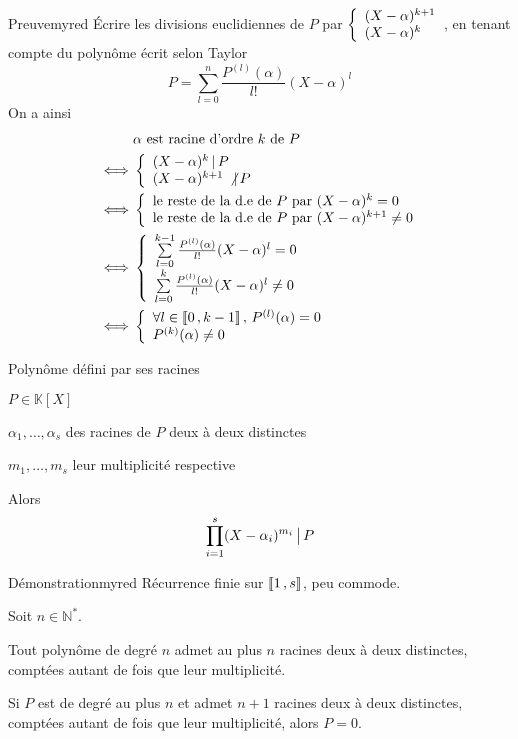     \begin{demo}{Preuve}{myred}
        Écrire les divisions euclidiennes de $P$ par $\et{(X-\alpha)^{k+1}}{(X-\alpha)^k}$, en tenant compte du polynôme écrit selon Taylor 
            \[ P = \sum\limits_{l=0}^n \frac{P^{(l)}(\alpha)}{l!} (X-\alpha)^l \]
            On a ainsi \begin{align*}
                & \alpha \text{ est racine d’ordre } k \text{ de } P \\
                \iff & \et{(X-\alpha)^k \, | \, P}{(X - \alpha)^{k+1} \, \not| \, P} \\
                \iff & \et{\text{le reste de la d.e de } P \text{ par } (X-\alpha)^k = 0}{\text{le reste de la d.e de } P \text{ par } (X-\alpha)^{k+1} \neq 0} \\
                \iff & \et{\sum\limits_{l=0}^{k-1} \frac{P^{(l)}(\alpha)}{l!} (X-\alpha)^l = 0}{\sum\limits_{l=0}^{k} \frac{P^{(l)}(\alpha)}{l!} (X-\alpha)^l \neq 0} \\
                \iff & \et{\forall l \in \intervalleEntier{0}{k-1}, \, P^{(l)}(\alpha) = 0}{P^{(k)}(\alpha) \neq 0}
            \end{align*}
    \end{demo}

    \begin{theo}{Polynôme défini par ses racines}{}
        \begin{soient}
            \item $P \in \mathbb{K}[X]$
            \item $\alpha_1,\ldots,\alpha_s$ des racines de $P$ deux à deux distinctes
            \item $m_1,\ldots,m_s$ leur multiplicité respective
        \end{soient}
    
        Alors \[ \prod\limits_{i = 1}^s (X - \alpha_i)^{m_i} \, \big| \, P \] 
    \end{theo}
    
    \begin{demo}{Démonstration}{myred}
        Récurrence finie sur $\left\llbracket 1 \, , s \right\rrbracket$, peu commode.
    \end{demo}
    
    \begin{coro}{}{}
        Soit $n \in \mathbb{N}^*$. 
    
        \begin{alors}
            \item Tout polynôme de degré $n$ admet au plus $n$ racines deux à deux distinctes, comptées autant de fois que leur multiplicité.
            \item Si $P$ est de degré au plus $n$ et admet $n+1$ racines deux à deux distinctes, comptées autant de fois que leur multiplicité, alors $P = 0$.
        \end{alors}
    \end{coro}
    
